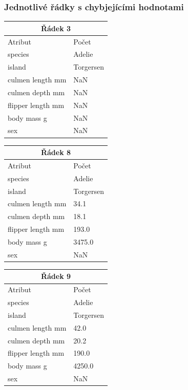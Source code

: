\documentclass[10pt,xcolor=pdflatex,dvipsnames,table,oneside]{book}
\begin{document}
\subsubsection{Jednotlivé řádky s chybjejícími hodnotami}
\vspace{1em}
\begin{tabular}{|l|l|}
    \hline
    \multicolumn{2}{|c|}{Řádek 3} \\
    \hline
    \hline
    Atribut & Počet \\
    \hline
    \hline
    species           &    Adelie \\
    island            & Torgersen \\
    culmen length mm  &       NaN \\
    culmen depth mm   &       NaN \\
    flipper length mm &       NaN \\
    body mass g       &       NaN \\
    sex               &       NaN \\
    \hline
\end{tabular}
\begin{tabular}{|l|l|}
    \hline
    \multicolumn{2}{|c|}{Řádek 8} \\
    \hline
    \hline
    Atribut & Počet \\
    \hline
    \hline
    species           &    Adelie \\
    island            & Torgersen \\
    culmen length mm  &      34.1 \\
    culmen depth mm   &      18.1 \\
    flipper length mm &     193.0 \\
    body mass g       &    3475.0 \\
    sex               &       NaN \\
    \hline
\end{tabular}
\begin{tabular}{|l|l|}
    \hline
    \multicolumn{2}{|c|}{Řádek 9} \\
    \hline
    \hline
    Atribut & Počet \\
    \hline
    \hline
    species           &    Adelie \\
    island            & Torgersen \\
    culmen length mm  &      42.0 \\
    culmen depth mm   &      20.2 \\
    flipper length mm &     190.0 \\
    body mass g       &    4250.0 \\
    sex               &       NaN \\
    \hline
\end{tabular}
\end{document}
